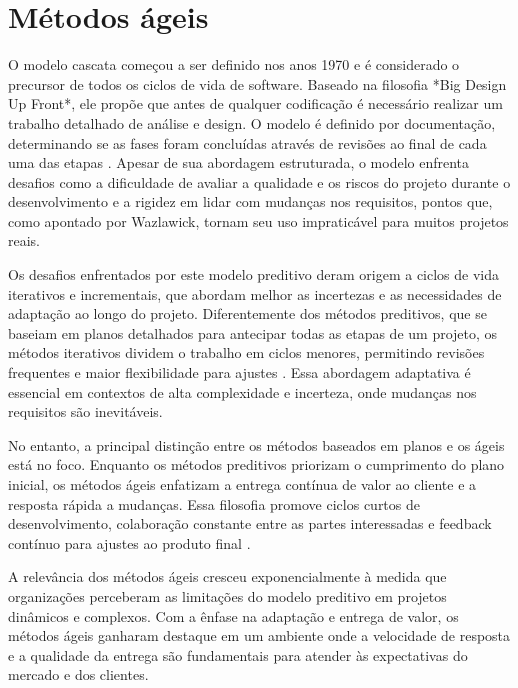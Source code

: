 \documentclass[
	12pt,
	openright,
	twoside,
	a4paper,
	english,
	brazil
	]{abntex2}
\begin{document}

\section{Métodos ágeis}

O modelo cascata começou a ser definido nos anos 1970 e é considerado o  precursor de todos os ciclos de vida de software. Baseado na filosofia *Big Design Up Front*, ele propõe que antes de qualquer codificação  é necessário realizar um trabalho detalhado de análise e design. O modelo é definido por documentação, determinando se as fases foram concluídas através de revisões ao final de cada uma das etapas \cite{wazlawick2019}. Apesar de sua abordagem estruturada, o modelo enfrenta desafios como a dificuldade de avaliar a qualidade e os riscos do projeto durante o desenvolvimento e a rigidez em lidar com mudanças nos requisitos, pontos que, como apontado por Wazlawick, tornam seu uso impraticável para muitos projetos reais.

Os desafios enfrentados por este modelo preditivo deram origem a ciclos de vida iterativos e incrementais, que abordam melhor as incertezas e as necessidades de adaptação ao longo do projeto. Diferentemente dos métodos preditivos, que se baseiam em planos detalhados para antecipar todas as etapas de um projeto, os métodos iterativos dividem o trabalho em ciclos menores, permitindo revisões frequentes e maior flexibilidade para ajustes \cite{AgileGuide}. Essa abordagem adaptativa é essencial em contextos de alta complexidade e incerteza, onde mudanças nos requisitos são inevitáveis.

No entanto, a principal distinção entre os métodos baseados em planos e os ágeis está no foco. Enquanto os métodos preditivos priorizam o cumprimento do plano inicial, os métodos ágeis enfatizam a entrega contínua de valor ao cliente e a resposta rápida a mudanças. Essa filosofia promove ciclos curtos de desenvolvimento, colaboração constante entre as partes interessadas e feedback contínuo para ajustes ao produto final \cite{AgileGuide}.

A relevância dos métodos ágeis cresceu exponencialmente à medida que organizações perceberam as limitações do modelo preditivo em projetos dinâmicos e complexos. Com a ênfase na adaptação e entrega de valor, os métodos ágeis ganharam destaque em um ambiente onde a velocidade de resposta e a qualidade da entrega são fundamentais para atender às expectativas do mercado e dos clientes.
\end{document}
